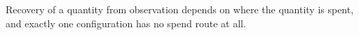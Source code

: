 Recovery of a quantity from observation depends on where the quantity is spent, and exactly one configuration has no spend route at all.
\par
